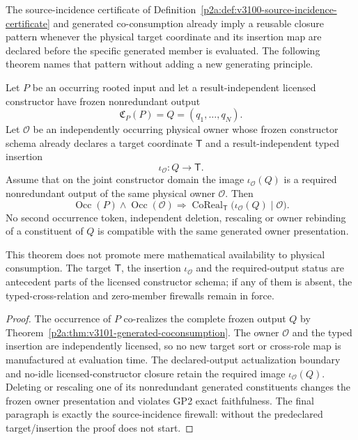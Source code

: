\documentclass[12pt,a4paper]{article}
\begin{document}
The source-incidence certificate of Definition~\ref{p2a:def:v3100-source-incidence-certificate}
and generated co-consumption already imply a reusable closure pattern whenever
the physical target coordinate and its insertion map are declared before the
specific generated member is evaluated.  The following theorem names that
pattern without adding a new generating principle.

\begin{theorem}
\label{p2a:thm:v3109-generated-member-owner-corealization}
Let $P$ be an occurring rooted input and let a result-independent licensed
constructor have frozen nonredundant output
\[
 \mathfrak C_P(P)=Q=(q_1,\ldots,q_N).
\]
Let $\mathcal O$ be an independently occurring physical owner whose frozen
constructor schema already declares a target coordinate $\mathsf T$ and a
result-independent typed insertion
\[
 \iota_{\mathcal O}:Q\longrightarrow\mathsf T.
\]
Assume that on the joint constructor domain the image
$\iota_{\mathcal O}(Q)$ is a required nonredundant output of the same physical
owner $\mathcal O$.  Then
\[
 \boxed{
 \operatorname{Occ}(P)\wedge\operatorname{Occ}(\mathcal O)
 \Longrightarrow
 \operatorname{CoReal}_{\mathsf T}
 \bigl(\iota_{\mathcal O}(Q)\mid\mathcal O\bigr).}
\]
No second occurrence token, independent deletion, rescaling or owner rebinding
of a constituent of $Q$ is compatible with the same generated owner
presentation.

This theorem does not promote mere mathematical availability to physical
consumption.  The target $\mathsf T$, the insertion $\iota_{\mathcal O}$ and
the required-output status are antecedent parts of the licensed constructor
schema; if any of them is absent, the typed-cross-relation and zero-member
firewalls remain in force.
\end{theorem}

\begin{proof}
The occurrence of $P$ co-realizes the complete frozen output $Q$ by
Theorem~\ref{p2a:thm:v3101-generated-coconsumption}.  The owner $\mathcal O$
and the typed insertion are independently licensed, so no new target sort or
cross-role map is manufactured at evaluation time.  The declared-output
actualization boundary and no-idle licensed-constructor closure retain the
required image $\iota_{\mathcal O}(Q)$.  Deleting or rescaling one of its
nonredundant generated constituents changes the frozen owner presentation and
violates GP2 exact faithfulness.  The final paragraph is exactly the
source-incidence firewall: without the predeclared target/insertion the proof
does not start.
\end{proof}
\end{document}
